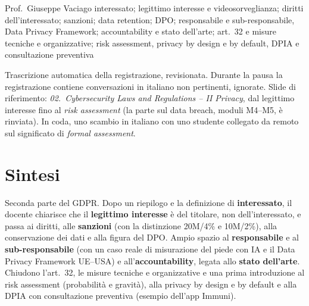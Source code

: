   {Prof.~Giuseppe Vaciago}
  {interessato; legittimo interesse e videosorveglianza; diritti dell'interessato; sanzioni; data
   retention; DPO; responsabile e sub-responsabile, Data Privacy Framework; accountability e stato
   dell'arte; art.~32 e misure tecniche e organizzative; risk assessment, privacy by design e by default,
   DPIA e consultazione preventiva}
\label{lez:2026-09-28}

\begin{nota}[Fonte]
Trascrizione automatica della registrazione, revisionata. Durante la pausa la registrazione contiene
conversazioni in italiano non pertinenti, ignorate. Slide di riferimento: \emph{02.~Cybersecurity Laws
and Regulations -- II Privacy}, dal legittimo interesse fino al \emph{risk assessment} (la parte sul
data breach, moduli M4--M5, è rinviata). In coda, uno scambio in italiano con uno studente collegato
da remoto sul significato di \emph{formal assessment}.
\end{nota}

\section{Sintesi}
Seconda parte del GDPR. Dopo un riepilogo e la definizione di \textbf{interessato}, il docente chiarisce
che il \textbf{legittimo interesse} è del titolare, non dell'interessato, e passa ai diritti, alle
\textbf{sanzioni} (con la distinzione 20M/4\% e 10M/2\%), alla conservazione dei dati e alla figura del
DPO. Ampio spazio al \textbf{responsabile} e al \textbf{sub-responsabile} (con un caso reale di
misurazione del piede con IA e il Data Privacy Framework UE--USA) e all'\textbf{accountability},
legata allo \textbf{stato dell'arte}. Chiudono l'art.~32, le misure tecniche e organizzative e una
prima introduzione al risk assessment (probabilità e gravità), alla privacy by design e by default e
alla DPIA con consultazione preventiva (esempio dell'app Immuni).

